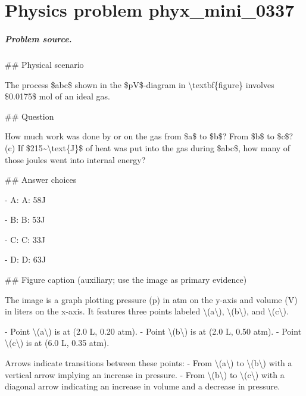 
\chapter{Physics problem phyx\_mini\_0337}
\label{ch:PhyXMiniProblems_problem_phyx_mini_0337}

\paragraph{Problem source.}
\#\# Physical scenario

The process \$abc\$ shown in the \$pV\$-diagram in \textbackslash{}textbf\{figure\} involves \$0.0175\$ mol of an ideal gas.

\#\# Question

How much work was done by or on the gas from \$a\$ to \$b\$? From \$b\$ to \$c\$? (c) If \$215\textasciitilde{}\textbackslash{}text\{J\}\$ of heat was put into the gas during \$abc\$, how many of those joules went into internal energy?

\#\# Answer choices

- A: A: 58J

- B: B: 53J

- C: C: 33J

- D: D: 63J

\#\# Figure caption (auxiliary; use the image as primary evidence)

The image is a graph plotting pressure (p) in atm on the y-axis and volume (V) in liters on the x-axis. It features three points labeled \textbackslash{}(a\textbackslash{}), \textbackslash{}(b\textbackslash{}), and \textbackslash{}(c\textbackslash{}). 

- Point \textbackslash{}(a\textbackslash{}) is at (2.0 L, 0.20 atm).
- Point \textbackslash{}(b\textbackslash{}) is at (2.0 L, 0.50 atm).
- Point \textbackslash{}(c\textbackslash{}) is at (6.0 L, 0.35 atm).

Arrows indicate transitions between these points:
- From \textbackslash{}(a\textbackslash{}) to \textbackslash{}(b\textbackslash{}) with a vertical arrow implying an increase in pressure.
- From \textbackslash{}(b\textbackslash{}) to \textbackslash{}(c\textbackslash{}) with a diagonal arrow indicating an increase in volume and a decrease in pressure.

